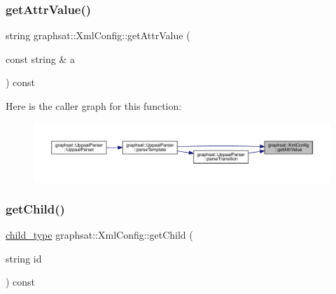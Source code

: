 \mbox{\label{classgraphsat_1_1_xml_config_a6f5d856d63643bcaa71589985331d1ad}} 
\subsubsection{\texorpdfstring{getAttrValue()}{getAttrValue()}}
{\footnotesize\ttfamily string graphsat\+::\+Xml\+Config\+::get\+Attr\+Value (\begin{DoxyParamCaption}\item[{const string \&}]{a }\end{DoxyParamCaption}) const\hspace{0.3cm}{\ttfamily [inline]}}

Here is the caller graph for this function\+:
\nopagebreak
\begin{figure}[H]
\begin{center}
\leavevmode
\includegraphics[width=350pt]{classgraphsat_1_1_xml_config_a6f5d856d63643bcaa71589985331d1ad_icgraph}
\end{center}
\end{figure}
\mbox{\label{classgraphsat_1_1_xml_config_a7db6e5780e6eecff5c904b909eaefe22}} 
\subsubsection{\texorpdfstring{getChild()}{getChild()}}
{\footnotesize\ttfamily \mbox{\hyperlink{namespacegraphsat_aba2f5cf076d49898cc0469bee94d3a05}{child\+\_\+type}} graphsat\+::\+Xml\+Config\+::get\+Child (\begin{DoxyParamCaption}\item[{string}]{id }\end{DoxyParamCaption}) const}


